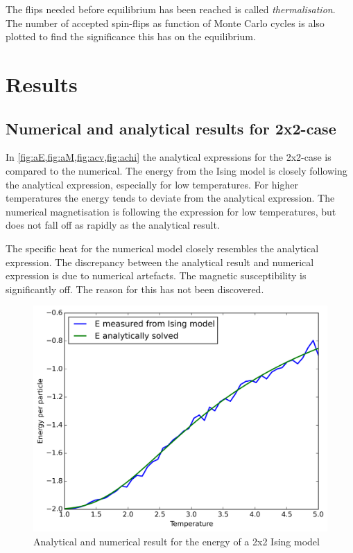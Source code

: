 \documentclass[11pt,a4paper,final]{article}
\numberwithin{equation}{section}
\newcommand{\figurewidth}{.85\textwidth}
\begin{document}
The flips needed before equilibrium has been reached is 
called \emph{thermalisation}. The number of accepted spin-flips as 
function of Monte Carlo cycles is also plotted to find the significance 
this has on the equilibrium.

\section{Results}

\subsection{Numerical and analytical results for 2x2-case}

In \cref{fig:aE,fig:aM,fig:acv,fig:achi}
 the analytical expressions for the 2x2-case is compared to the numerical.
The energy from the Ising model is closely following the analytical 
expression, especially for low temperatures. For higher temperatures
the energy tends to deviate from the analytical expression. The 
numerical magnetisation is following the expression for low 
temperatures, but does not fall off as rapidly as the analytical result.

The specific heat for the numerical model closely resembles the analytical
expression. The discrepancy between the analytical result and numerical 
expression is due to numerical artefacts. The magnetic susceptibility
is significantly off. The reason for this has not been discovered.


\begin{figure}
\centering
\includegraphics[width=\figurewidth]{pics/aE.png}
\caption{Analytical and numerical result for the energy 
of a 2x2 Ising model}
\label{fig:aE}
\end{figure}
\end{document}
